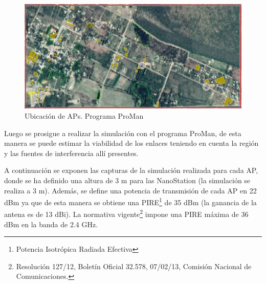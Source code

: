 \documentclass[12pt,a4paper]{book}
\begin{document}
\begin{figure} [H]
\centering
\includegraphics[width= 15cm]{../figuras/ubicacionDeAPs_Acceso.JPG}

\caption{Ubicación de APs. Programa ProMan}
\label{Fig_UbicacionDeAPs}
\end{figure}


Luego se prosigue a realizar la simulación con el programa ProMan, de esta manera se puede estimar la viabilidad de los enlaces teniendo en cuenta la región y las fuentes de interferencia allí presentes. \medskip

A continuación se exponen las capturas de la simulación realizada para cada AP, donde se ha definido una altura de 3 m para las NanoStation (la simulación se realiza a 3 m). Además, se define una  potencia de transmisión de cada AP en 22 dBm ya que de esta manera se obtiene una PIRE\footnote{Potencia Isotrópica Radiada Efectiva} de 35 dBm (la
ganancia de la antena es de 13 dBi). La normativa vigente\footnote{Resolución
127/12, Boletín Oficial 32.578, 07/02/13, Comisión Nacional de Comunicaciones.} impone una PIRE máxima de 36 dBm en la banda de 2.4 GHz.

\medskip
\end{document}
